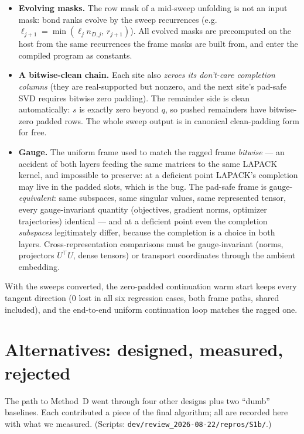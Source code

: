 \documentclass[11pt]{article}
\theoremstyle{definition}
\theoremstyle{remark}
\newcommand{\code}[1]{\texttt{#1}}
\begin{document}
\begin{itemize}[itemsep=2pt]
\item \textbf{Evolving masks.} The row mask of a mid-sweep unfolding is not an input mask: bond
ranks evolve by the sweep recurrences (e.g.\ $\ell_{j+1} = \min(\ell_j n_{D,j},\, r_{j+1})$). All
evolved masks are precomputed on the host from the same recurrences the frame masks are built from,
and enter the compiled program as constants.
\item \textbf{A bitwise-clean chain.} Each site also \emph{zeroes its don't-care completion
columns} (they are real-supported but nonzero, and the next site's pad-safe SVD requires bitwise
zero padding). The remainder side is clean automatically: $s$ is exactly zero beyond $q$, so
pushed remainders have bitwise-zero padded rows. The whole sweep output is in canonical
clean-padding form for free.
\item \textbf{Gauge.} The uniform frame used to match the ragged frame \emph{bitwise} --- an
accident of both layers feeding the same matrices to the same LAPACK kernel, and impossible to
preserve: at a deficient point LAPACK's completion may live in the padded slots, which is the bug.
The pad-safe frame is gauge-\emph{equivalent}: same subspaces, same singular values, same
represented tensor, every gauge-invariant quantity (objectives, gradient norms, optimizer
trajectories) identical --- and at a deficient point even the completion \emph{subspaces}
legitimately differ, because the completion is a choice in both layers. Cross-representation
comparisons must be gauge-invariant (norms, projectors $U^{\top}U$, dense tensors) or transport
coordinates through the ambient embedding.
\end{itemize}

With the sweeps converted, the zero-padded continuation warm start keeps every tangent direction
(0 lost in all six regression cases, both frame paths, shared included), and the end-to-end uniform
continuation loop matches the ragged one.

\appendix
\section{Alternatives: designed, measured, rejected}\label{app:alt}

The path to Method~D went through four other designs plus two ``dumb'' baselines. Each contributed
a piece of the final algorithm; all are recorded here with what we measured. (Scripts:
\code{dev/review\_2026-08-22/repros/S1b/}.)
\end{document}
